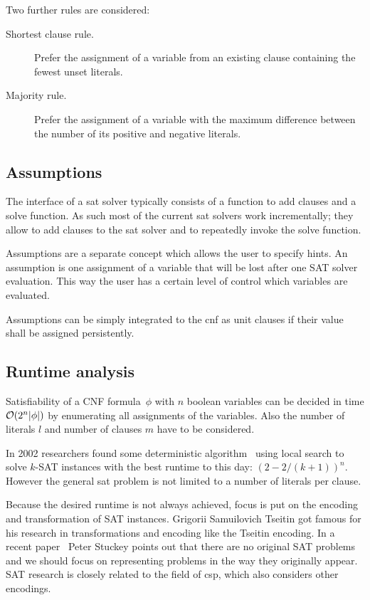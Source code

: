 Two further rules are considered:
\begin{description}
  \item[Shortest clause rule.]
    Prefer the assignment of a variable from an existing clause containing the fewest unset literals.
  \item[Majority rule.]
    Prefer the assignment of a variable with the maximum difference between the number of its positive and negative literals.
\end{description}

\subsection{Assumptions}
\label{sec:satsolvers-assumptions}
%
The interface of a \gls{sat} solver typically consists of a function to add clauses and a solve function. As such most of the current \gls{sat} solvers work incrementally; they allow to add clauses to the \gls{sat} solver and to repeatedly invoke the solve function.

Assumptions are a separate concept which allows the user to specify hints. An assumption is one assignment of a variable that will be lost after one SAT solver evaluation. This way the user has a certain level of control which variables are evaluated.

Assumptions can be simply integrated to the \gls{cnf} as unit clauses if their value shall be assigned persistently.

\subsection{Runtime analysis}
\label{sec:satsolvers-runtime}
%
Satisfiability of a CNF formula~$\phi$ with $n$ boolean variables can be decided in time $\mathcal{O}(2^n \lvert \phi\rvert)$ by enumerating all assignments of the variables. Also the number of literals $l$ and number of clauses $m$ have to be considered.

In 2002 researchers found some deterministic algorithm~\cite{Sat07} using local search to solve $k$-SAT instances with the best runtime to this day: $(2 - 2/(k+1))^n$. However the general \gls{sat} problem is not limited to a number of literals per clause.

Because the desired runtime is not always achieved, focus is put on the encoding and transformation of SAT instances. Grigorii Samuilovich Tseitin got famous for his research in transformations and encoding like the Tseitin encoding. In a recent paper~\cite{Sat22} Peter Stuckey points out that there are no original SAT problems and we should focus on representing problems in the way they originally appear. SAT research is closely related to the field of \gls{csp}, which also considers other encodings.

